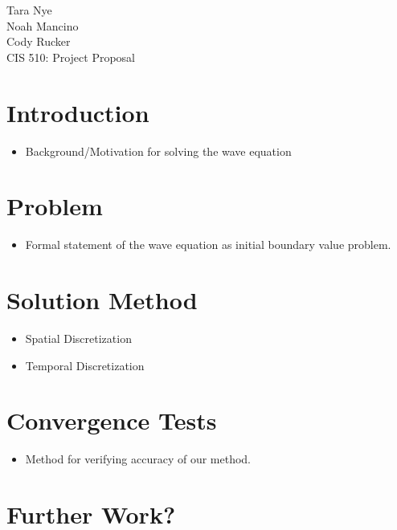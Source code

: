 \documentclass[12pt]{article}
\begin{document}
\begin{flushleft}

Tara Nye\\
Noah Mancino\\
Cody Rucker\\
\vspace{0.25cm}
CIS 510: Project Proposal\\

\section*{Introduction}\thispagestyle{plain}
\begin{itemize}
	\item Background/Motivation for solving the wave equation
\end{itemize}

\section*{Problem}
\begin{itemize}
	\item Formal statement of the wave equation as initial boundary value problem.
\end{itemize}

\section*{Solution Method}
\begin{itemize}
	\item Spatial Discretization

	\item Temporal Discretization
\end{itemize}

\section*{Convergence Tests}
\begin{itemize}
	\item Method for verifying accuracy of our method.
\end{itemize}

\pagebreak
\section*{Further Work?}

\end{flushleft}
\end{document}
